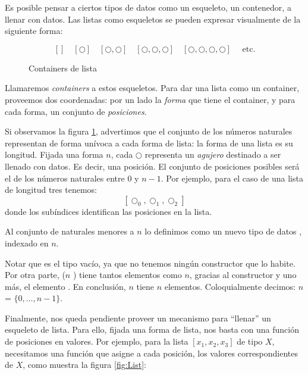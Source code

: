 Es posible pensar a ciertos tipos de datos como un esqueleto, un contenedor, a llenar con datos. 
Las listas como esqueletos se pueden expresar visualmente de la siguiente forma:
\begin{figure}[H]
$$ [] \quad [\bigcirc] \quad [\bigcirc , \bigcirc] \quad [\bigcirc , \bigcirc, \bigcirc] \quad [\bigcirc , \bigcirc, \bigcirc, \bigcirc ] \quad \mbox{ etc.}$$
\caption{Containers de lista}
\label{fig:cList}
\end{figure}

Llamaremos {\it containers} a estos esqueletos. Para dar una lista como un container, proveemos dos coordenadas: por un lado la {\it forma} que tiene el container, y para cada forma, un conjunto de {\it posiciones}.

Si observamos la figura \ref{fig:cList}, advertimos que el conjunto de los números naturales representan de forma unívoca a cada forma de lista: la forma de una lista es su longitud.
Fijada una forma $n$, cada $\bigcirc$ representa un {\it agujero} destinado a ser llenado con datos. Es decir, una posición.
El conjunto de posiciones posibles será el de los números naturales entre $0$ y $n - 1$. Por ejemplo, para el caso de una lista de longitud tres tenemos:
$$[\bigcirc_0 , \bigcirc_1, \bigcirc_2]$$
donde los subíndices identifican las posiciones en la lista.

Al conjunto de naturales menores a $n$ lo definimos como un nuevo tipo de datos , indexado en $n$.


Notar que   es el tipo vacío, ya que no tenemos ningún constructor que lo habite. Por otra parte,  ($n$ \AgdaFunction{+} ) tiene tantos elementos como  $n$, gracias al constructor  y uno más, el elemento . 
En conclusión,  $n$ tiene $n$ elementos. Coloquialmente decimos:  $n$ = $\{0, \ldots, n-1 \}$.


Finalmente, nos queda pendiente proveer un mecanismo para ``llenar'' un esqueleto de lista. Para ello, fijada una forma de lista, nos basta con una función de posiciones en valores.
Por ejemplo, para la lista $[x_1,x_2,x_3]$ de tipo $X$, necesitamos una función que asigne a cada posición, los valores correspondientes de $X$, como muestra la figura \ref{fig:List}:

